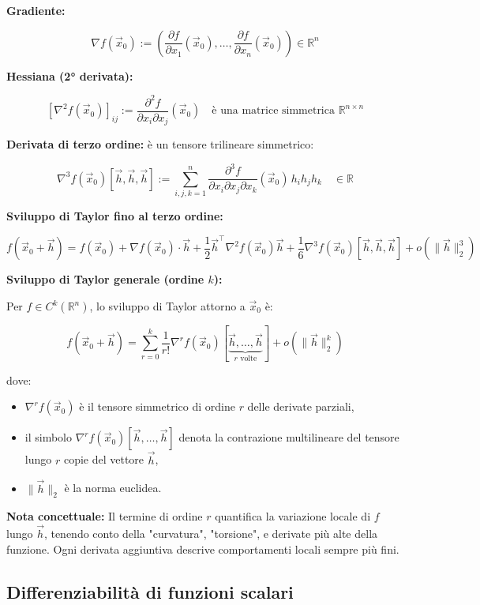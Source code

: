 \documentclass[12pt,a4paper]{article}
\begin{document}
\textbf{Gradiente:}

\[
\nabla f(\vec{x}_0) := \left( \frac{\partial f}{\partial x_1}(\vec{x}_0), \dots, \frac{\partial f}{\partial x_n}(\vec{x}_0) \right) \in \mathbb{R}^n
\]

\textbf{Hessiana (2° derivata):}

\[
\left[\nabla^2 f(\vec{x}_0)\right]_{ij} := \frac{\partial^2 f}{\partial x_i \partial x_j}(\vec{x}_0)
\quad \text{è una matrice simmetrica } \mathbb{R}^{n \times n}
\]

\textbf{Derivata di terzo ordine:} è un tensore trilineare simmetrico:

\[
\nabla^3 f(\vec{x}_0)[\vec{h}, \vec{h}, \vec{h}] := 
\sum_{i,j,k=1}^{n} 
\frac{\partial^3 f}{\partial x_i \partial x_j \partial x_k}(\vec{x}_0) 
\, h_i h_j h_k
\quad \in \mathbb{R}
\]

\textbf{Sviluppo di Taylor fino al terzo ordine:}

\[
f(\vec{x}_0 + \vec{h}) = 
f(\vec{x}_0) 
+ \nabla f(\vec{x}_0) \cdot \vec{h} 
+ \frac{1}{2} \vec{h}^\top \nabla^2 f(\vec{x}_0) \vec{h}
+ \frac{1}{6} \nabla^3 f(\vec{x}_0)[\vec{h}, \vec{h}, \vec{h}]
+ o(\|\vec{h}\|_2^3)
\]

\textbf{Sviluppo di Taylor generale (ordine \( k \)):}

Per \( f \in C^k(\mathbb{R}^n) \), lo sviluppo di Taylor attorno a \( \vec{x}_0 \) è:

\[
f(\vec{x}_0 + \vec{h}) = \sum_{r=0}^{k} \frac{1}{r!} \nabla^r f(\vec{x}_0)[\underbrace{\vec{h}, \dots, \vec{h}}_{r \text{ volte}}] + o(\|\vec{h}\|_2^k)
\]

dove: \begin{itemize}
\item \( \nabla^r f(\vec{x}_0) \) è il tensore simmetrico di ordine \( r \) delle derivate parziali,
\item il simbolo \( \nabla^r f(\vec{x}_0)[\vec{h}, \dots, \vec{h}] \) denota la contrazione multilineare del tensore lungo \( r \) copie del vettore \( \vec{h} \),
\item \( \|\vec{h}\|_2 \) è la norma euclidea.\end{itemize}

\textbf{Nota concettuale:}  
Il termine di ordine \( r \) quantifica la variazione locale di \( f \) lungo \( \vec{h} \), tenendo conto della "curvatura", "torsione", e derivate più alte della funzione. Ogni derivata aggiuntiva descrive comportamenti locali sempre più fini.


\subsection*{Differenziabilità di funzioni scalari}
\end{document}
